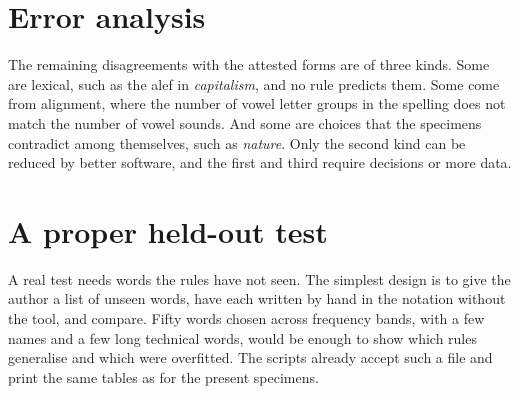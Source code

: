 \section{Error analysis}
The remaining disagreements with the attested forms are of three kinds. Some are lexical, such as the alef in \emph{capitalism}, and no rule predicts them. Some come from alignment, where the number of vowel letter groups in the spelling does not match the number of vowel sounds. And some are choices that the specimens contradict among themselves, such as \emph{nature}. Only the second kind can be reduced by better software, and the first and third require decisions or more data.

\section{A proper held-out test}
A real test needs words the rules have not seen. The simplest design is to give the author a list of unseen words, have each written by hand in the notation without the tool, and compare. Fifty words chosen across frequency bands, with a few names and a few long technical words, would be enough to show which rules generalise and which were overfitted. The scripts already accept such a file and print the same tables as for the present specimens.
